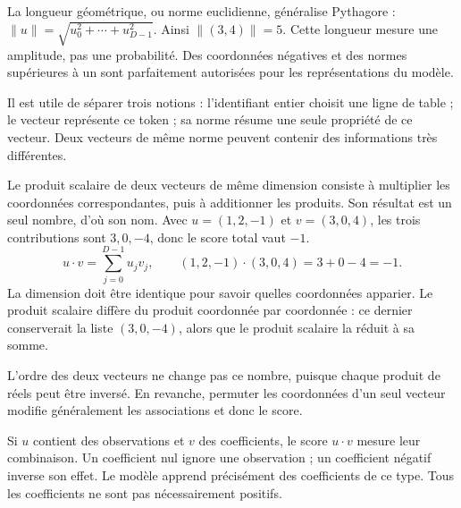 La longueur géométrique, ou norme euclidienne, généralise Pythagore :
\(\|u\|=\sqrt{u_0^2+\cdots+u_{D-1}^2}\).
Ainsi \(\|(3,4)\|=5\). Cette longueur mesure une amplitude,
pas une probabilité. Des coordonnées négatives et des normes supérieures
à un sont parfaitement autorisées pour les représentations du modèle.

Il est utile de séparer trois notions : l'identifiant entier choisit
une ligne de table ; le vecteur représente ce token ; sa norme résume
une seule propriété de ce vecteur. Deux vecteurs de même norme peuvent
contenir des informations très différentes.



Le produit scalaire de deux vecteurs de même dimension consiste à
multiplier les coordonnées correspondantes, puis à additionner les
produits. Son résultat est un seul nombre, d'où son nom.
Avec \(u=(1,2,-1)\) et \(v=(3,0,4)\), les trois contributions
sont \(3,0,-4\), donc le score total vaut \(-1\).
\[
 u\cdot v=\sum_{j=0}^{D-1}u_jv_j,
 \qquad (1,2,-1)\cdot(3,0,4)=3+0-4=-1.
\]
La dimension doit être identique pour savoir quelles coordonnées
apparier. Le produit scalaire diffère du produit coordonnée par
coordonnée : ce dernier conserverait la liste \((3,0,-4)\),
alors que le produit scalaire la réduit à sa somme.

L'ordre des deux vecteurs ne change pas ce nombre, puisque chaque
produit de réels peut être inversé. En revanche, permuter les
coordonnées d'un seul vecteur modifie généralement les associations
et donc le score.

Si \(u\) contient des observations et \(v\) des coefficients,
le score \(u\cdot v\) mesure leur combinaison. Un coefficient nul
ignore une observation ; un coefficient négatif inverse son effet.
Le modèle apprend précisément des coefficients de ce type.
Tous les coefficients ne sont pas nécessairement positifs.

